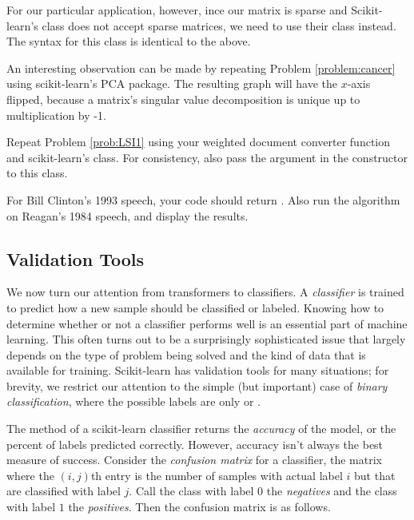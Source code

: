 For our particular application, however, ince our matrix is sparse and Scikit-learn's  class does not accept sparse matrices, we need to use their  class instead.
The syntax for this class is identical to the above.

\begin{info}
An interesting observation can be made by repeating Problem \ref{problem:cancer} using scikit-learn's PCA package.
The resulting graph will have the $x$-axis flipped, because a matrix's singular value decomposition is unique up to multiplication by -1.
\end{info}

\begin{problem} %
Repeat Problem \ref{prob:LSI1} using your weighted document converter function and scikit-learn's  class.
For consistency, also pass the argument  in the constructor to this class.

For Bill Clinton's 1993 speech, your code should return .
Also run the algorithm on Reagan's 1984 speech, and display the results.
\end{problem}

\subsection*{Validation Tools} %

We now turn our attention from transformers to classifiers.
A \emph{classifier} is trained to predict how a new sample should be classified or labeled.
Knowing how to determine whether or not a classifier performs well is an essential part of machine learning.
This often turns out to be a surprisingly sophisticated issue that largely depends on the type of problem being solved and the kind of data that is available for training.
Scikit-learn has validation tools for many situations; for brevity, we restrict our attention to the simple (but important) case of \emph{binary classification}, where the possible labels are only  or .

The  method of a scikit-learn classifier returns the \emph{accuracy} of the model, or the percent of labels predicted correctly.
However, accuracy isn't always the best measure of success.
Consider the \emph{confusion matrix} for a classifier, the matrix where the $(i,j)$th entry is the number of samples with actual label $i$ but that are classified with label $j$.
Call the class with label $0$ the \emph{negatives} and the class with label $1$ the \emph{positives}.
Then the confusion matrix is as follows.

